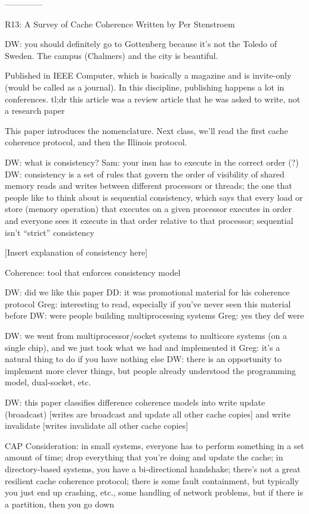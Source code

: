 --------------

R13: A Survey of Cache Coherence
Written by Per Stenstroem

DW: you should definitely go to Gottenberg because it's not the Toledo of Sweden.
The campus (Chalmers) and the city is beautiful.

Published in IEEE Computer, which is basically a magazine and is invite-only (would be called as a journal).
In this discipline, publishing happens a lot in conferences.
tl;dr this article was a review article that he was asked to write, not a research paper

This paper introduces the nomenclature.
Next class, we'll read the first cache coherence protocol, and then the Illinois protocol.

DW: what is consistency?
Sam: your insn has to execute in the correct order (?)
DW: consistency is a set of rules that govern the order of visibility of shared memory reads and writes between different processors or threads; the one that people like to think about is sequential consistency, which says that every load or store (memory operation) that executes on a given processor executes in order and everyone sees it execute in that order relative to that processor; sequential isn't ``strict'' consistency

[Insert explanation of consistency here]

Coherence: tool that enforces consistency model

DW: did we like this paper
DD: it was promotional material for his coherence protocol
Greg: interesting to read, especially if you've never seen this material before
DW: were people building multiprocessing systems
Greg: yes they def were

DW: we went from multiprocessor/socket systems to multicore systems (on a single chip), and we just took what we had and implemented it
Greg: it's a natural thing to do if you have nothing else
DW: there is an opportunity to implement more clever things, but people already understood the programming model, dual-socket, etc.

DW: this paper classifies difference coherence models into write update (broadcast) [writes are broadcast and update all other cache copies] and write invalidate [writes invalidate all other cache copies]

CAP Consideration: in small systems, everyone has to perform something in a set amount of time; drop everything that you're doing and update the cache; in directory-based systems, you have a bi-directional handshake; there's not a great resilient cache coherence protocol; there is some fault containment, but typically you just end up crashing, etc., some handling of network problems, but if there is a partition, then you go down



